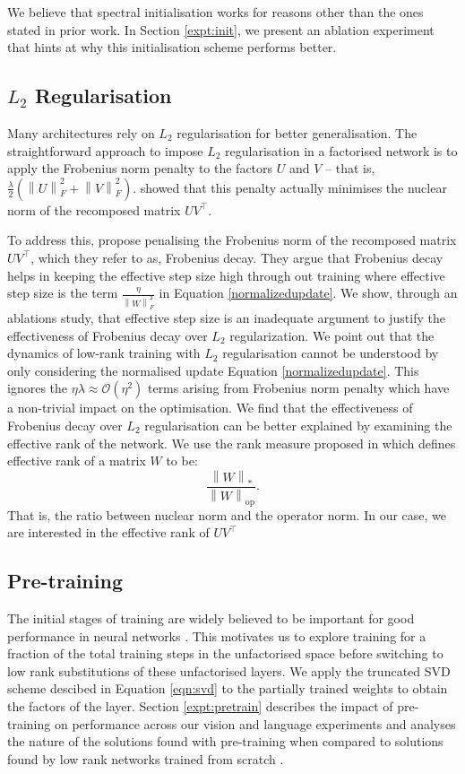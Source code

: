 \documentclass{article}
\newcommand{\norm}[2]{\left\lVert #1 \right\rVert_{#2}}
\begin{document}
We believe that spectral initialisation works for reasons other than the ones stated in prior work. In Section \ref{expt:init}, we present an ablation experiment that hints at why this initialisation scheme performs better.

\subsection{$L_2$ Regularisation}
Many architectures rely on $L_2$ regularisation for better generalisation. The straightforward approach to impose $L_2$ regularisation in a factorised network is to apply the Frobenius norm penalty to the factors $U$ and $V$ -- that is, $\frac{\lambda}{2}(\norm{U}{F}^2+\norm{V}{F}^2)$.  \cite{nuclearnormlemma} showed that this penalty actually minimises the nuclear norm of the recomposed matrix $UV^\top$. 



To address this, \cite{khodak2021initialization} propose penalising the Frobenius norm of the recomposed matrix $UV^\top$, which they refer to as, Frobenius decay. They argue that Frobenius decay helps in keeping the effective step size high through out training where effective step size is the term $\frac{\eta}{\norm{W}{F}^2}$ in Equation \ref{normalizedupdate}. We show, through an ablations study, that effective step size is an inadequate argument to justify the effectiveness of Frobenius decay over $L_2$ regularization. We point out that the dynamics of low-rank training with $L_2$ regularisation cannot be understood by only considering the normalised update Equation \ref{normalizedupdate}. This ignores the $ \eta \lambda \approx \mathcal{O}(\eta^2)$ terms arising from Frobenius norm penalty which have a non-trivial impact on the optimisation.
We find that the effectiveness of Frobenius decay over $L_2$ regularisation can be better explained by examining the effective rank of the network. We use the rank measure proposed in  \cite{implicitregmahoney} which defines effective rank of a matrix $W$ to be:
$$\frac{\norm{W}{*}}{\norm{W}{\text{op}}}.$$
That is, the ratio between nuclear norm and the operator norm. In our case, we are interested in the effective rank of $UV^{\top}$

\subsection{Pre-training} \label{pretraining}
The initial stages of training are widely believed to be important for good performance in neural networks \cite{criticalperiod} \cite{lateresetting}. This motivates us to explore training for a fraction of the total training steps in the unfactorised space before switching to low rank substitutions of these unfactorised layers. We apply the truncated SVD scheme descibed in Equation \ref{eqn:svd} to the partially trained weights to obtain the factors of the layer. Section \ref{expt:pretrain} describes the impact of pre-training on performance across our vision and language experiments and analyses the nature of the solutions found with pre-training when compared to solutions found by low rank networks trained from scratch \cite{interpolation} \cite{linearmodeconn}.
\end{document}
